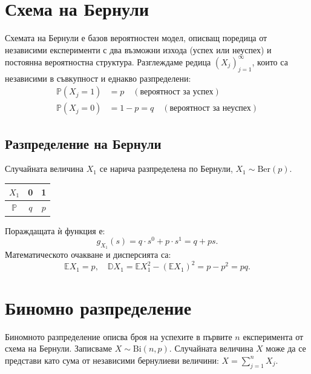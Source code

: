 \documentclass{article}
\begin{document}
\section{Схема на Бернули}

Схемата на Бернули е базов вероятностен модел, описващ поредица от независими експерименти с два възможни изхода (успех или неуспех) и постоянна вероятностна структура.
Разглеждаме редица $(X_j)_{j=1}^{\infty}$, които са независими в съвкупност и еднакво разпределени:
\begin{align*}
\mathbb{P}(X_j=1) &= p \quad (\text{вероятност за успех}) \\
\mathbb{P}(X_j=0) &= 1-p = q \quad (\text{вероятност за неуспех})
\end{align*}

\subsection{Разпределение на Бернули}
Случайната величина $X_1$ се нарича разпределена по Бернули, $X_1 \sim \text{Ber}(p)$.
\begin{center}
\begin{tabular}{c|c|c}
$X_1$ & 0 & 1 \\ \hline
$\mathbb{P}$ & $q$ & $p$
\end{tabular}
\end{center}
Пораждащата ѝ функция е:
\[ g_{X_1}(s) = q \cdot s^0 + p \cdot s^1 = q + ps. \]
Математическото очакване и дисперсията са:
\[ \mathbb{E}X_1 = p, \quad \mathbb{D}X_1 = \mathbb{E}X_1^2 - (\mathbb{E}X_1)^2 = p - p^2 = pq. \]

\section{Биномно разпределение}

Биномното разпределение описва броя на успехите в първите $n$ експеримента от схема на Бернули. Записваме $X \sim \text{Bi}(n, p)$.
Случайната величина $X$ може да се представи като сума от независими бернулиеви величини: $X = \sum_{j=1}^n X_j$.
\end{document}
